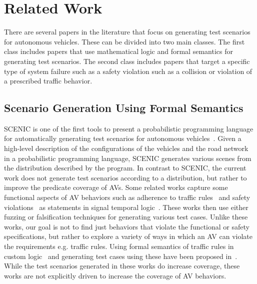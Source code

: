 \section{Related Work}
There are several papers in the literature that focus on generating test scenarios for autonomous vehicles.
% 
These can be divided into two main classes.
% 
The first class includes papers that use mathematical logic and formal semantics for generating test scenarios.
% 
The second class includes papers that target a specific type of system failure such as a safety violation such as a collision or violation of a prescribed traffic behavior.
% 

\subsection{Scenario Generation Using Formal Semantics}
SCENIC is one of the first tools to present a probabilistic programming language for automatically generating test scenarios for autonomous vehicles~\cite{fremont2019scenic}.
% 
Given a high-level description of the configurations of the vehicles and the road network in a probabilistic programming language, SCENIC generates various scenes from the distribution described by the program.
% 
In contrast to SCENIC, the current work does not generate test scenarios according to a distribution, but rather to improve the predicate coverage of AVs.
% 
Some related works capture some functional aspects of AV behaviors such as adherence to traffic rules~\cite{maierhofer2020formalization} and safety violations~\cite{dreossi2019verifai} as statements in signal temporal logic~\cite{tuncali2016utilizing}.
% 
These works then use either fuzzing or falsification techniques for generating various test cases.
% 
Unlike these works, our goal is not to find just behaviors that violate the functional or safety specifications, but rather to explore a variety of ways in which an AV can violate the requirements e.g. traffic rules.
% 
Using formal semantics of traffic rules in custom logic~\cite{Karimi.2020,Bozga.2022} and generating test cases using these have been proposed in~\cite{karimi2022automatic,li2023simulation}.
% 
While the test scenarios generated in these works do increase coverage, these works are not explicitly driven to increase the coverage of AV behaviors.

